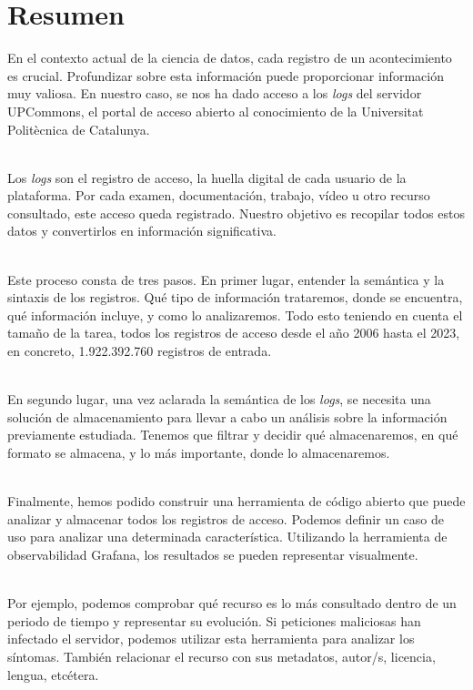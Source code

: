 \chapter*{Resumen}\label{ch:abstract-es}

En el contexto actual de la ciencia de datos, cada registro de un acontecimiento es crucial.
Profundizar sobre esta información puede proporcionar información muy valiosa.
En nuestro caso, se nos ha dado acceso a los \textit{logs} del servidor UPCommons, el portal de acceso abierto al conocimiento de la Universitat Politècnica de Catalunya.

\noindent \\
Los \textit{logs} son el registro de acceso, la huella digital de cada usuario de la plataforma.
Por cada examen, documentación, trabajo, vídeo u otro recurso consultado, este acceso queda registrado.
Nuestro objetivo es recopilar todos estos datos y convertirlos en información significativa.

\noindent \\
Este proceso consta de tres pasos.
En primer lugar, entender la semántica y la sintaxis de los registros.
Qué tipo de información trataremos, donde se encuentra, qué información incluye, y como lo analizaremos.
Todo esto teniendo en cuenta el tamaño de la tarea, todos los registros de acceso desde el año 2006 hasta el 2023, en concreto, 1.922.392.760 registros de entrada.

\noindent \\
En segundo lugar, una vez aclarada la semántica de los \textit{logs}, se necesita una solución de almacenamiento para llevar a cabo un análisis sobre la información previamente estudiada.
Tenemos que filtrar y decidir qué almacenaremos, en qué formato se almacena, y lo más importante, donde lo almacenaremos.

\noindent \\
Finalmente, hemos podido construir una herramienta de código abierto que puede analizar y almacenar todos los registros de acceso.
Podemos definir un caso de uso para analizar una determinada característica.
Utilizando la herramienta de observabilidad Grafana, los resultados se pueden representar visualmente.

\noindent \\
Por ejemplo, podemos comprobar qué recurso es lo más consultado dentro de un periodo de tiempo y representar su evolución.
Si peticiones maliciosas han infectado el servidor, podemos utilizar esta herramienta para analizar los síntomas.
También relacionar el recurso con sus metadatos, autor/s, licencia, lengua, etcétera.

